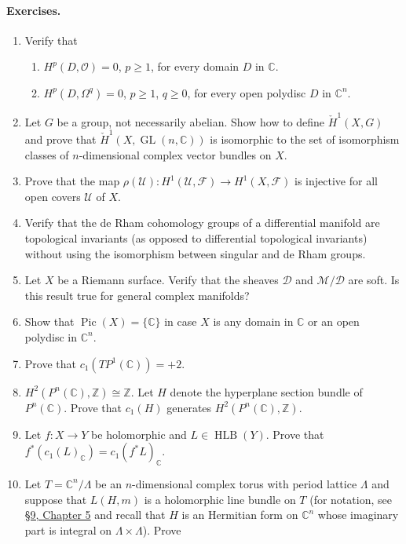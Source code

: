 \paragraph{Exercises.}
\begin{enumerate}
\item Verify that
\begin{enumerate}[label=\alph*)]
\item $H^p(D,\mathcal O)=0$, $p\geq1$, for every domain $D$ in $\mathbb C$.
\item $H^p(D,\Omega^q)=0$, $p\geq1$, $q\geq0$, for every open polydisc $D$ in $\mathbb C^n$.
\end{enumerate}
\item Let $G$ be a group, not necessarily abelian. Show how to define $\check H^1(X,G)$ and prove that $\check H^1(X,\operatorname{GL}(n,\mathbb C))$ is isomorphic to the set of isomorphism classes of $n$-dimensional complex vector bundles on $X$.
\item Prove that the map $\rho(\mathcal U):H^1(\mathcal U,\mathcal F)\to H^1(X,\mathcal F)$ is injective for all open covers $\mathcal U$ of $X$.
\item Verify that the de Rham cohomology groups of a differential manifold are topological invariants (as opposed to differential topological invariants) without using the isomorphism between singular and de Rham groups.
\item Let $X$ be a Riemann surface. Verify that the sheaves $\mathcal D$ and $\mathcal M/\mathcal D$ are soft. Is this result true for general complex manifolds?
\item Show that $\operatorname{Pic}(X)=\{\mathbb C\}$ in case $X$ is any domain in $\mathbb C$ or an open polydisc in $\mathbb C^n$.
\item Prove that $c_1(TP^1(\mathbb C))=+2$.
\item $H^2(P^n(\mathbb C),\mathbb Z)\cong\mathbb Z$. Let $H$ denote the hyperplane section bundle of $P^n(\mathbb C)$. Prove that $c_1(H)$ generates $H^2(P^n(\mathbb C),\mathbb Z)$.
\item Let $f:X\to Y$ be holomorphic and $L\in\operatorname{HLB}(Y)$. Prove that $f^*(c_1(L)_{\mathbb C})=c_1(f^*L)_{\mathbb C}$.
\item Let $T=\mathbb C^n/\Lambda$ be an $n$-dimensional complex torus with period lattice $\Lambda$ and suppose that $L(H,m)$ is a holomorphic line bundle on $T$ (for notation, see \hyperref[sec:5:9]{\S9, Chapter 5} and recall that $H$ is an Hermitian form on $\mathbb C^n$ whose imaginary part is integral on $\Lambda\times\Lambda$). Prove

\end{enumerate}
